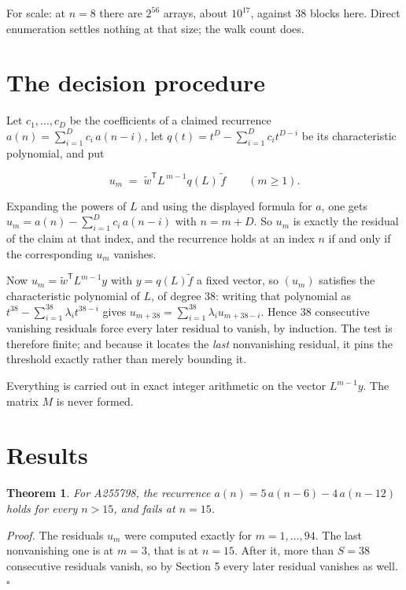 \documentclass[11pt]{article}
\newtheorem{theorem}{Theorem}
\theoremstyle{definition}
\begin{document}
For scale: at $n = 8$ there are $2^{56}$ arrays, about $10^{17}$, against $38$ blocks here. Direct enumeration settles nothing at that size; the walk count does.

\section{The decision procedure}

Let $c_1,\dots,c_D$ be the coefficients of a claimed recurrence $a(n) = \sum_{i=1}^{D} c_i\,a(n-i)$, let $q(t) = t^{D} - \sum_{i=1}^{D} c_i t^{D-i}$ be its characteristic polynomial, and put

\[u_m \;=\; \tilde w^{\mathsf T} L^{\,m-1} q(L)\,\tilde f \qquad (m \ge 1).\]

Expanding the powers of $L$ and using the displayed formula for $a$, one gets $u_m = a(n) - \sum_{i=1}^{D} c_i\,a(n-i)$ with $n = m + D$. So $u_m$ is exactly the residual of the claim at that index, and the recurrence holds at an index $n$ if and only if the corresponding $u_m$ vanishes.

Now $u_m = \tilde w^{\mathsf T} L^{m-1} y$ with $y = q(L)\tilde f$ a fixed vector, so $(u_m)$ satisfies the characteristic polynomial of $L$, of degree $38$: writing that polynomial as $t^{38} - \sum_{i=1}^{38} \lambda_i t^{38-i}$ gives $u_{m+38} = \sum_{i=1}^{38} \lambda_i u_{m+38-i}$. Hence $38$ consecutive vanishing residuals force every later residual to vanish, by induction. The test is therefore finite; and because it locates the {\itshape last} nonvanishing residual, it pins the threshold exactly rather than merely bounding it.

Everything is carried out in exact integer arithmetic on the vector $L^{m-1}y$. The matrix $M$ is never formed.

\section{Results}

\begin{theorem} For A255798, the recurrence $a(n) = 5\,a(n-6) - 4\,a(n-12)$ holds for every $n > 15$, and fails at $n = 15$.\end{theorem}

{\itshape Proof.} The residuals $u_m$ were computed exactly for $m = 1,\dots,94$. The last nonvanishing one is at $m = 3$, that is at $n = 15$. After it, more than $S = 38$ consecutive residuals vanish, so by Section 5 every later residual vanishes as well. $\square$
\end{document}
